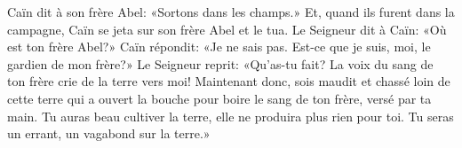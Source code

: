 Caïn dit à son frère Abel: «Sortons dans les champs.»
Et, quand ils furent dans la campagne, Caïn se jeta sur son frère Abel et le tua.
Le Seigneur dit à Caïn: «Où est ton frère Abel?»
Caïn répondit: «Je ne sais pas.
	Est-ce que je suis, moi, le gardien de mon frère?»
Le Seigneur reprit: «Qu’as-tu fait?
	La voix du sang de ton frère crie de la terre vers moi!
Maintenant donc, sois maudit et chassé loin de cette terre
	qui a ouvert la bouche pour boire le sang de ton frère, versé par ta main.
Tu auras beau cultiver la terre, elle ne produira plus rien pour toi.
	Tu seras un errant, un vagabond sur la terre.»
